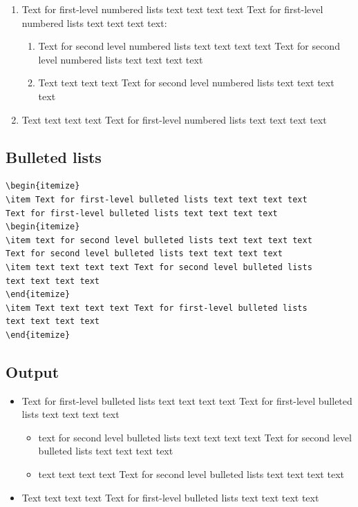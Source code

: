 \documentclass[]{imag-ms-template}
\begin{document}
\begin{enumerate}
\item Text for first-level numbered lists text text text text Text for first-level numbered lists text text text text: 
\begin{enumerate}
\item Text for second level numbered lists text text text text Text for second level numbered lists text text text text 
\item Text text text text Text for second level numbered lists text text text text 
\end{enumerate}
\item Text text text text Text for first-level numbered lists text text text text 
\end{enumerate}

\subsection*{Bulleted lists}

\begin{verbatim}
\begin{itemize}
\item Text for first-level bulleted lists text text text text
Text for first-level bulleted lists text text text text 
\begin{itemize}
\item text for second level bulleted lists text text text text
Text for second level bulleted lists text text text text 
\item text text text text Text for second level bulleted lists
text text text text 
\end{itemize}
\item Text text text text Text for first-level bulleted lists
text text text text 
\end{itemize}
\end{verbatim}

\subsection*{Output}

\begin{itemize}
\item Text for first-level bulleted lists text text text text Text for first-level bulleted lists text text text text 
\begin{itemize}
\item text for second level bulleted lists text text text text Text for second level bulleted lists text text text text 
\item text text text text Text for second level bulleted lists text text text text 
\end{itemize}
\item Text text text text Text for first-level bulleted lists text text text text 
\end{itemize}
\end{document}
